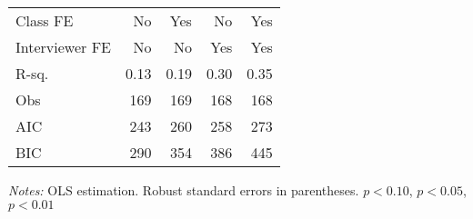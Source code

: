 \begin{table}[!h]
\begin{threeparttable}
\begin{tabular}{l*{4}{D{.}{.}{-1}}}
Class FE    &                  No   &                 Yes   &                  No   &                 Yes   \\
Interviewer FE&                  No   &                  No   &                 Yes   &                 Yes   \\
\midrule
R-sq.       &                0.13   &                0.19   &                0.30   &                0.35   \\
Obs         &                 169   &                 169   &                 168   &                 168   \\
AIC         &                 243   &                 260   &                 258   &                 273   \\
BIC         &                 290   &                 354   &                 386   &                 445   \\
\bottomrule
\end{tabular}
\begin{tablenotes}
\footnotesize

\flushleft \textit{Notes:} OLS estimation. Robust standard errors in parentheses. \sym{*} \(p<0.10\), \sym{**} \(p<0.05\), \sym{***} \(p<0.01\)
\end{tablenotes}
\end{threeparttable}
\label{tab:cheat_math_long}
\end{table}
